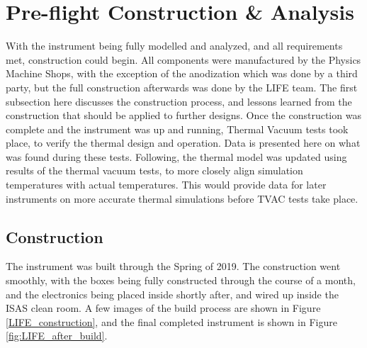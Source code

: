 \section{Pre-flight Construction \& Analysis}\label{preflight_const_analysis}
With the instrument being fully modelled and analyzed, and all requirements met, construction could begin. All components were manufactured by the Physics Machine Shops, with the exception of the anodization which was done by a third party, but the full construction afterwards was done by the LIFE team. The first subsection here discusses the construction process, and lessons learned from the construction that should be applied to further designs. Once the construction was complete and the instrument was up and running, Thermal Vacuum tests took place, to verify the thermal design and operation. Data is presented here on what was found during these tests. Following, the thermal model was updated using results of the thermal vacuum tests, to more closely align simulation temperatures with actual temperatures. This would provide data for later instruments on more accurate thermal simulations before TVAC tests take place. 

\subsection{Construction}
The instrument was built through the Spring of 2019. The construction went smoothly, with the boxes being fully constructed through the course of a month, and the electronics being placed inside shortly after, and wired up inside the ISAS clean room. A few images of the build process are shown in Figure \ref{LIFE_construction}, and the final completed instrument is shown in Figure \ref{fig:LIFE_after_build}.

